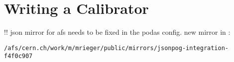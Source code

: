 \section{Writing a Calibrator}
\label{calibrator}
!! json mirror for afs needs to be fixed in the podas config. new mirror in :

\texttt{/afs/cern.ch/work/m/mrieger/public/mirrors/jsonpog-integration-f4f0c907}
